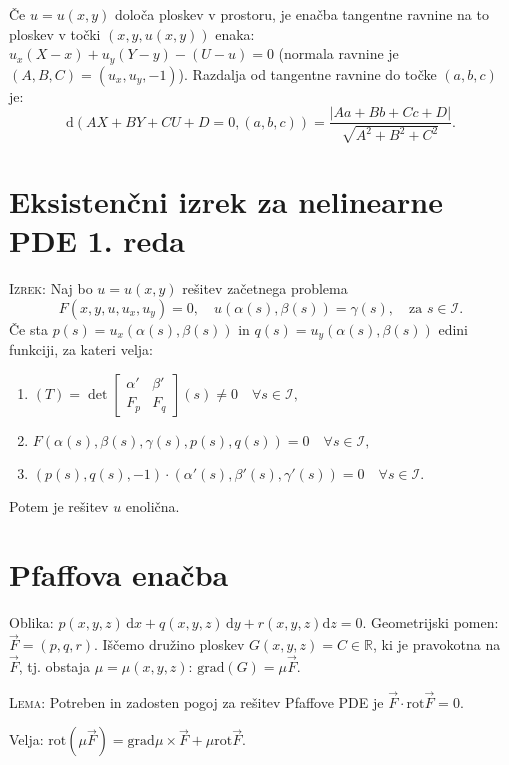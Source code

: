 \documentclass[8pt,a4paper]{amsart}
\theoremstyle{definition} %
\theoremstyle{plain} %
\newcommand{\dx}{\ensuremath{\,\mathrm{d}x}}
\newcommand{\dy}{\ensuremath{\,\mathrm{d}y}}
\newcommand{\R}{\mathbb R}
\begin{document}
Če $u = u(x,y)$ določa ploskev v prostoru, je enačba tangentne ravnine na to
ploskev v točki $(x,y,u(x,y))$ enaka: $u_x (X-x) + u_y (Y-y) - (U-u)=0$ (normala
ravnine je $(A,B,C) = (u_x,u_y,-1)$). Razdalja od tangentne ravnine do točke
$(a,b,c)$ je: $$ \text{d}(AX+BY+CU+D=0, (a,b,c)) =
\frac{|Aa+Bb+Cc+D|}{\sqrt{A^2+B^2+C^2}}.  $$


\section*{Eksistenčni izrek za nelinearne PDE 1. reda}

\textsc{Izrek:} Naj bo $u=u(x, y)$ rešitev začetnega problema $$
F(x,y,u,u_x,u_y)=0, \quad u(\alpha(s),\beta(s))=\gamma(s), \quad \text{za } s
\in \mathcal{I}.  $$ Če sta $p(s)=u_x(\alpha(s),\beta(s))$ in $q(s) =
u_y(\alpha(s),\beta(s))$ edini funkciji, za kateri velja: \begin{enumerate}
  \item $ (T) = \det{\begin{bmatrix} \alpha' & \beta' \\ F_p & F_q
  \end{bmatrix}}(s) \neq 0 \quad \forall s \in \mathcal{I},$ \item
    $F(\alpha(s),\beta(s),\gamma(s),p(s),q(s))=0 \quad \forall s \in
    \mathcal{I},$ \item $(p(s),q(s),-1) \cdot (\alpha'(s),\beta'(s),\gamma'(s))
      = 0 \quad \forall s \in \mathcal{I}.$ \end{enumerate} Potem je rešitev $u$
  enolična.


\section*{Pfaffova enačba}

Oblika: $p(x,y,z)\dx+q(x,y,z)\dy+r(x,y,z)\text{d}z = 0$. Geometrijski pomen:
$\vec{F} = (p,q,r)$. Iščemo družino ploskev $G(x,y,z) = C \in \R$, ki je
pravokotna na $\vec{F}$, tj. obstaja $\mu = \mu(x,y,z)$: $\text{grad}(G) = \mu
\vec{F}$.

\textsc{Lema:} Potreben in zadosten pogoj za rešitev Pfaffove PDE je $\vec{F}
\cdot \text{rot}\vec{F} = 0$.

Velja: $\text{rot}(\mu \vec{F}) = \text{grad}\mu \times \vec{F} + \mu \text{rot}
\vec{F}$.
\end{document}

